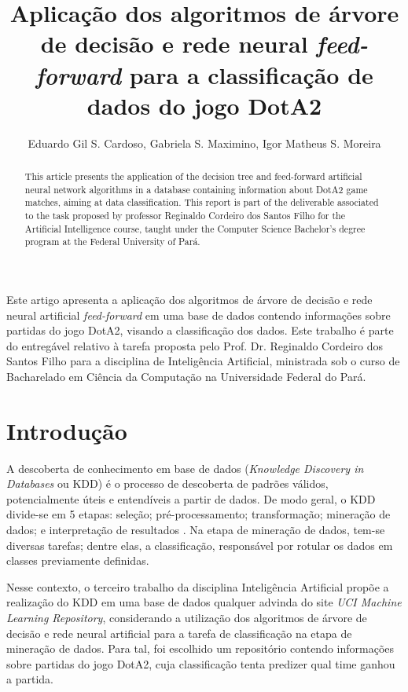 \documentclass[12pt]{article}
\title{Aplicação dos algoritmos de árvore de decisão e rede neural \textit{feed-forward} para a classificação de dados do jogo DotA2}
\author{Eduardo Gil S. Cardoso\inst{1}, Gabriela S. Maximino\inst{1}, Igor Matheus S. Moreira\inst{1}}
\begin{document}
 

\maketitle

\begin{abstract}
  This article presents the application of the decision tree and feed-forward artificial neural network algorithms in a database containing information about DotA2 game matches, aiming at data classification. This report is part of the deliverable associated to the task proposed by professor Reginaldo Cordeiro dos Santos Filho for the Artificial Intelligence course, taught under the Computer Science Bachelor’s degree program at the Federal University of Pará.
\end{abstract}
     
\begin{resumo} 
  Este artigo apresenta a aplicação dos algoritmos de árvore de decisão e rede neural artificial \textit{feed-forward} em uma base de dados contendo informações sobre partidas do jogo DotA2, visando a classificação dos dados. Este trabalho é parte do entregável relativo à tarefa proposta pelo Prof. Dr. Reginaldo Cordeiro dos Santos Filho para a disciplina de Inteligência Artificial, ministrada sob o curso de Bacharelado em Ciência da Computação na Universidade Federal do Pará.
\end{resumo}


\section{Introdução}\label{sec:intro}
A descoberta de conhecimento em base de dados (\textit{Knowledge Discovery in Databases} ou KDD) é o processo de descoberta de padrões válidos, potencialmente úteis e entendíveis a partir de dados. De modo geral, o KDD divide-se em 5 etapas: seleção; pré-processamento; transformação; mineração de dados; e interpretação de resultados \cite{fayyad}. Na etapa de mineração de dados, tem-se diversas tarefas; dentre elas, a classificação, responsável por rotular os dados em classes previamente definidas.

Nesse contexto, o terceiro trabalho da disciplina Inteligência Artificial propõe a realização do KDD em uma base de dados qualquer advinda do site \textit{UCI Machine Learning Repository}, considerando a utilização dos algoritmos de árvore de decisão e rede neural artificial para a tarefa de classificação na etapa de mineração de dados. Para tal, foi escolhido um repositório contendo informações sobre partidas do jogo DotA2, cuja classificação tenta predizer qual time ganhou a partida.
\end{document}
